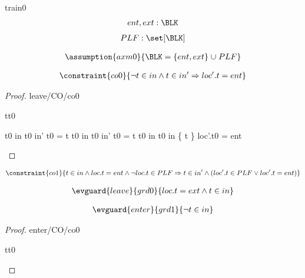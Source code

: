\documentclass[12pt]{amsart}
\begin{document}
\begin{machine}{train0}
\begin{align*}
\constant{	ent,ext : \BLK}
\end{align*}
\begin{align*}
\constant{	PLF : \set [\BLK]}
\end{align*}

\begin{align*}\assumption{axm0}
{	\BLK = \{ ent, ext \} \bunion PLF }
\end{align*}

%
\begin{align*}
\constraint{co0}
{	\neg t \in in \land t \in in' \implies  loc'.t = ent } %
\end{align*}
%
\begin{proof}{leave/CO/co0}
	\begin{free:var}{t}{t0}
	\begin{calculation}
		\neg t0 \in in \land t0 \in in'
	\hint{=}{ \ref{grd0} }
		\neg t0 = t \land \neg t0 \in in \land t0 \in in' 
	\hint{=}{ \ref{a0} }
		\neg t0 = t \land \neg t0 \in in \land t0 \in in \bunion \{ t \} 
		\false
		loc'.t0 = ent
	\end{calculation}
	\end{free:var}
\end{proof}
%
\begin{align*}
\constraint{co1}
{	 t \in in \land loc.t = ent  \land \neg loc.t \in PLF 
\implies t \in in' \land (loc'.t \in PLF \lor loc'.t = ent)	}
\end{align*}


%

\begin{align*}
\evguard{leave}{grd0}
{	loc.t = ext \land t \in in	}
\end{align*}

\begin{align*}
\evguard{enter}{grd1}
{	\neg t \in in	}
\end{align*}

\begin{proof}{enter/CO/co0}
	\begin{free:var}{t}{t0}


\end{free:var}
\end{proof}
\end{machine}
\end{document}

